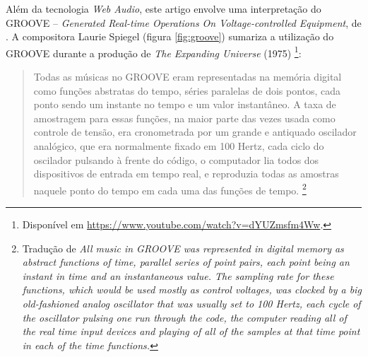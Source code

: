 Além da tecnologia \emph{Web Audio}, este artigo envolve uma interpretação do GROOVE -- \emph{Generated Real-time Operations On Voltage-controlled Equipment},  de \cite{mathews_groove_1970}. A compositora Laurie Spiegel (figura \ref{fig:groove}) sumariza a utilização do GROOVE durante a produção de \emph{The Expanding Universe} (1975) \footnote{Disponível em \url{https://www.youtube.com/watch?v=dYUZmsfm4Ww}.}:
\ \\
\begin{quote}
\small{Todas as músicas no GROOVE eram representadas na memória digital como funções abstratas do tempo, séries paralelas de dois pontos, cada ponto sendo um instante no tempo e um valor instantâneo. A taxa de amostragem para essas funções, na maior parte das vezes usada como controle de tensão, era cronometrada por um grande e antiquado oscilador analógico, que era normalmente fixado em 100 Hertz, cada ciclo do oscilador pulsando à frente do código, o computador lia todos dos dispositivos de entrada em tempo real, e reproduzia todas as amostras naquele ponto do tempo em cada uma das funções de tempo. \cite[online]{spiegel_expanding_1975} }\footnote{Tradução de \emph{All music in GROOVE was represented in digital memory as abstract functions of time, parallel series of point pairs, each point being an instant in time and an instantaneous value. The sampling rate for these functions, which would be used mostly as control voltages, was clocked by a big old-fashioned analog oscillator that was usually set to 100 Hertz, each cycle of the oscillator pulsing one run through the code, the computer reading all of the real time input devices and playing of all of the samples at that time point in each of the time functions.}}
\end{quote}

